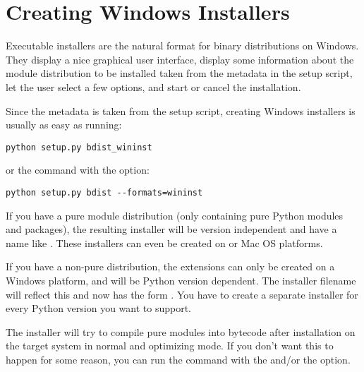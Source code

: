\documentclass{manual}
\begin{document}
%
%


\section{Creating Windows Installers}
\label{creating-wininst}

Executable installers are the natural format for binary distributions
on Windows.  They display a nice graphical user interface, display
some information about the module distribution to be installed taken
from the metadata in the setup script, let the user select a few
options, and start or cancel the installation.

Since the metadata is taken from the setup script, creating Windows
installers is usually as easy as running:

\begin{verbatim}
python setup.py bdist_wininst
\end{verbatim}

or the  command with the  option:

\begin{verbatim}
python setup.py bdist --formats=wininst
\end{verbatim}

If you have a pure module distribution (only containing pure Python
modules and packages), the resulting installer will be version
independent and have a name like .  These
installers can even be created on \UNIX{} or Mac OS platforms.

If you have a non-pure distribution, the extensions can only be
created on a Windows platform, and will be Python version dependent.
The installer filename will reflect this and now has the form
.  You have to create a separate installer
for every Python version you want to support.

The installer will try to compile pure modules into bytecode after
installation on the target system in normal and optimizing mode.  If
you don't want this to happen for some reason, you can run the
 command with the
 and/or the
 option.
\end{document}
